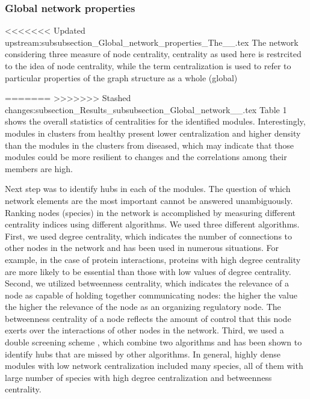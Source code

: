\subsubsection*{Global network properties}
<<<<<<< Updated upstream:subsubsection_Global_network_properties_The__.tex
The network considering three measure of node centrality, centrality as used here is restrcited to the idea of node centrality, while the term centralization is used to refer to particular properties of the graph structure as a whole (global)


=======
>>>>>>> Stashed changes:subsection_Results_subsubsection_Global_network__.tex
Table 1 shows the overall statistics of centralities for the identified modules. Interestingly, modules in clusters from healthy  present lower centralization and higher density than the modules in the clusters from diseased, which may indicate that those modules could be more resilient to changes and the correlations among their members are high.

Next step was to identify hubs in each of the modules. The question of which network elements are the most important cannot be answered unambiguously. Ranking nodes (species) in the network is accomplished by measuring different centrality indices using different algorithms. We used three different algorithms. First, we used degree centrality, which indicates the number of connections to other nodes in the network and has been used in numerous situations. For example, in the case of protein interactions, proteins with high degree centrality are more likely to be essential than those with low values of degree centrality. Second, we utilized betweenness centrality, which indicates the relevance of a node as capable of holding together communicating nodes: the higher the value the higher the relevance of the node as an organizing regulatory node. The betweenness centrality of a node reflects the amount of control that this node exerts over the interactions of other nodes in the network. Third, we used a double screening scheme , which combine two algorithms  and has been shown to identify hubs that are missed by other algorithms. In general, highly dense modules with low network centralization included many species, all of them with large number of species with high degree centralization and betweenness centrality.

